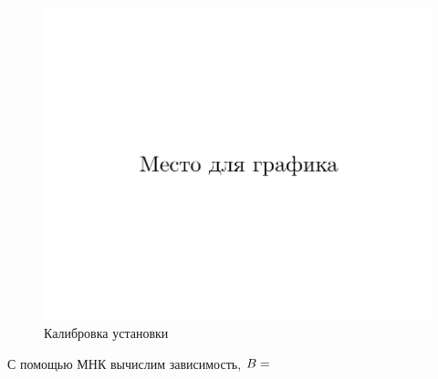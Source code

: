 \documentclass{physlab}
\begin{document}
\begin{table}[H]
\centering
\caption{Данные для калибровки установки}
\label{calibrate}
\end{table}

\begin{figure}[b!]\centering
	\label{graph1}
	\includegraphics[width=.65\tw]{foo}
			\caption{Калибровка установки}
	\end {figure}
С помощью МНК вычислим зависимость, $B = \val$
\end{document}
